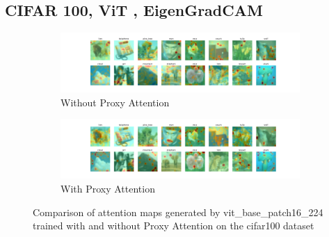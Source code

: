 \subsection{CIFAR 100, ViT , EigenGradCAM}
% 
    \begin{figure}[H]
        \begin{subfigure}[b]{1\textwidth}
            \includegraphics[width=\linewidth]{images/gpp_cifar100_vit_base_patch16_224_noproxy_0.pdf}
            \caption{Without Proxy Attention}
        \end{subfigure}
        \begin{subfigure}[b]{1\textwidth}
            \includegraphics[width=\linewidth]{images/gpp_cifar100_vit_base_patch16_224_proxy_0.pdf}
            \caption{With Proxy Attention}
        \end{subfigure}
        \caption{Comparison of attention maps generated by vit\_base\_patch16\_224 trained with and without Proxy Attention on the cifar100 dataset}
    \end{figure}
    


